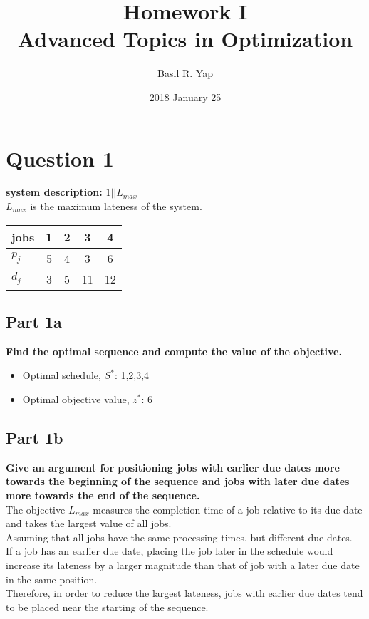 \documentclass[a4paper, fleqn]{article}
\begin{document}
\title{Homework I \\ Advanced Topics in Optimization}
\author{Basil R. Yap}
\date{2018 January 25}
\maketitle

\section{Question 1}

\textbf{system description: }$1||L_{max}$\\
$L_{max}$ is the maximum lateness of the system.
\begin{center}
\begin{tabular}{| l | c | c | c | c |}
\hline
jobs & 1 & 2 & 3 & 4 \\
\hline
$p_j$ & 5 & 4 & 3 & 6 \\
$d_j$ & 3 & 5 & 11 & 12 \\
\hline
\end{tabular}
\end{center}

\subsection{Part 1a}

\textbf{Find the optimal sequence and compute the value of the objective.}
\begin{itemize}
\item Optimal schedule, $S^*$: 1,2,3,4
\item Optimal objective value, $z^*$: 6
\end{itemize}


\subsection{Part 1b}

\textbf{Give an argument for positioning jobs with earlier due dates more towards the beginning of the sequence and jobs with later due dates more towards the end of the sequence.}\\
The objective $L_{max}$ measures the completion time of a job relative to its due date and takes the largest value of all jobs.\\
Assuming that all jobs have the same processing times, but different due dates.\\
If a job has an earlier due date, placing the job later in the schedule would increase its lateness by a larger magnitude than that of job with a later due date in the same position.\\
Therefore, in order to reduce the largest lateness, jobs with earlier due dates tend to be placed near the starting of the sequence.
\end{document}
